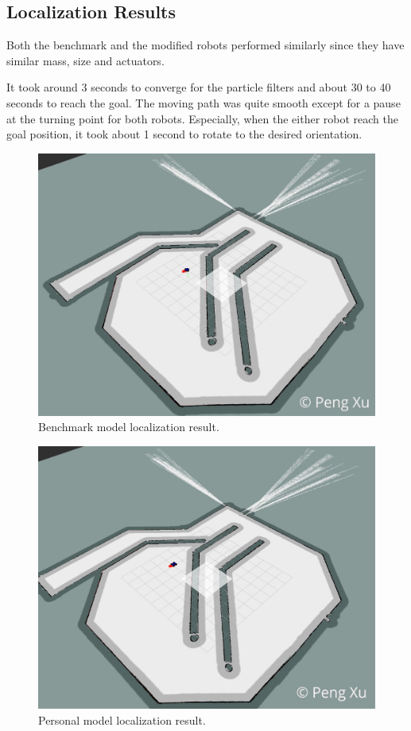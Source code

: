 \documentclass[10pt,journal,compsoc]{IEEEtran}
\begin{document}
\subsection{Localization Results}

Both the benchmark and the modified robots performed similarly since they have similar mass, size and actuators.

It took around 3 seconds to converge for the particle filters and about 30 to 40 seconds to reach the goal. The moving path was quite smooth except for a pause at the turning point for both robots. Especially, when the either robot reach the goal position, it took about 1 second to rotate to the desired orientation.

\begin{figure}[thpb]
    \centering
    \includegraphics[width=\linewidth]{images/udacity-bot-rviz-final.png}
    \caption{Benchmark model localization result.}
    \label{fig:udacity-bot-finish}
\end{figure}

\begin{figure}[thpb]
    \centering
    \includegraphics[width=\linewidth]{images//rover-bot-rviz-final.png}
    \caption{Personal model localization result.}
    \label{fig:rover-bot-finish}
\end{figure}
\end{document}
